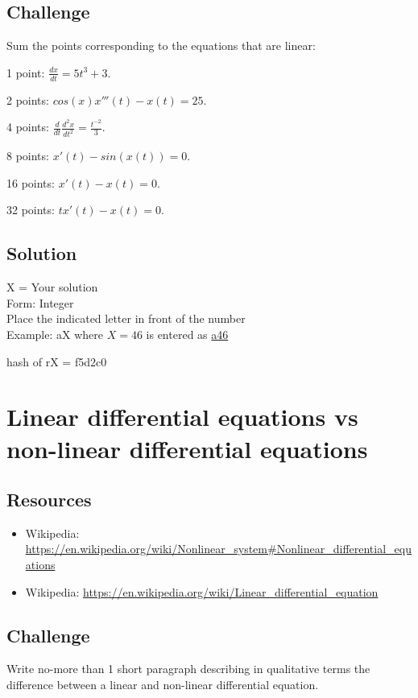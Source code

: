 \subsection*{Challenge}
Sum the points corresponding to the equations that are linear:

1 point: $\displaystyle \frac{dx}{dt} = 5t^3 + 3$.

2 points: $\displaystyle cos(x) x'''(t) - x(t) = 25$.

4 points: $\displaystyle \frac{d}{dt} \frac{d^2 x}{dt^2} = \frac{t^{-2}}{3}$.

8 points: $\displaystyle x'(t) - sin(x(t)) = 0$.

16 points: $\displaystyle x'(t) - x(t) = 0$.

32 points: $\displaystyle t x'(t) - x(t) = 0$.

\subsection*{Solution}
X = Your solution\\
Form: Integer\\
Place the indicated letter in front of the number\\
Example: aX where $X=46$ is entered as \href{http://www.wolframalpha.com/input/?i=md5+hash+of+\%22a46\%22}{a46}

hash of rX = f5d2c0




\newpage
\section{Linear differential equations vs non-linear differential equations}

\subsection*{Resources}
\begin{itemize}
    \item Wikipedia: \url{https://en.wikipedia.org/wiki/Nonlinear_system#Nonlinear_differential_equations}
    \item Wikipedia: \url{https://en.wikipedia.org/wiki/Linear_differential_equation}
\end{itemize}

\subsection*{Challenge}
Write no-more than 1 short paragraph describing in qualitative terms the difference between a linear and non-linear differential equation.

